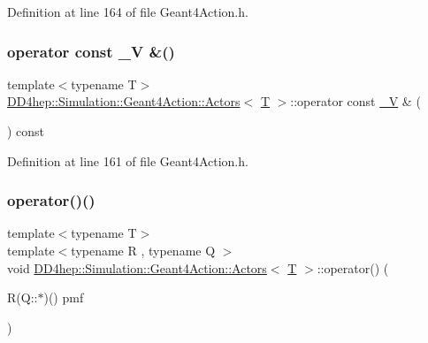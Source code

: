 Definition at line 164 of file Geant4\+Action.\+h.

\hypertarget{class_d_d4hep_1_1_simulation_1_1_geant4_action_1_1_actors_ad292ecb199162749cc5256605571c0d6}{}\label{class_d_d4hep_1_1_simulation_1_1_geant4_action_1_1_actors_ad292ecb199162749cc5256605571c0d6} 
\subsubsection{\texorpdfstring{operator const \+\_\+\+V \&()}{operator const \_V \&()}}
{\footnotesize\ttfamily template$<$typename T$>$ \\
\hyperlink{class_d_d4hep_1_1_simulation_1_1_geant4_action_1_1_actors}{D\+D4hep\+::\+Simulation\+::\+Geant4\+Action\+::\+Actors}$<$ \hyperlink{class_t}{T} $>$\+::operator const \hyperlink{class_d_d4hep_1_1_simulation_1_1_geant4_action_1_1_actors_a18b6dfb1542a2cd036d8317db48f6c16}{\+\_\+V} \& (\begin{DoxyParamCaption}{ }\end{DoxyParamCaption}) const\hspace{0.3cm}{\ttfamily [inline]}}



Definition at line 161 of file Geant4\+Action.\+h.

\hypertarget{class_d_d4hep_1_1_simulation_1_1_geant4_action_1_1_actors_aa8cac14e649580acf65f8a1c0392e6e3}{}\label{class_d_d4hep_1_1_simulation_1_1_geant4_action_1_1_actors_aa8cac14e649580acf65f8a1c0392e6e3} 
\subsubsection{\texorpdfstring{operator()()}{operator()()}\hspace{0.1cm}{\footnotesize\ttfamily [1/6]}}
{\footnotesize\ttfamily template$<$typename T$>$ \\
template$<$typename R , typename Q $>$ \\
void \hyperlink{class_d_d4hep_1_1_simulation_1_1_geant4_action_1_1_actors}{D\+D4hep\+::\+Simulation\+::\+Geant4\+Action\+::\+Actors}$<$ \hyperlink{class_t}{T} $>$\+::operator() (\begin{DoxyParamCaption}\item[{R(Q\+::$\ast$)()}]{pmf }\end{DoxyParamCaption})\hspace{0.3cm}{\ttfamily [inline]}}



